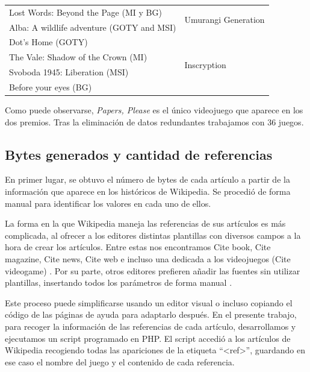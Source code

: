 \documentclass[spanish]{textolivre}
\begin{document}
\begin{table}[h!]
\begin{threeparttable}
\begin{tabular}{ll}
Lost Words: Beyond the Page (MI y BG) & \multirow{2}{*}{Umurangi Generation}\\ 
Alba: A wildlife adventure (GOTY and MSI) & \\
\midrule

Dot’s Home (GOTY) & \multirow{4}{*}{Inscryption}\\
The Vale: Shadow of the Crown (MI) & \\
Svoboda 1945: Liberation (MSI) & \\ 
Before your eyes (BG) & \\
\bottomrule
\end{tabular}
\end{threeparttable}
\end{table}

Como puede observarse, \emph{Papers, Please} es el único videojuego que aparece en los dos premios. Tras la eliminación de datos redundantes trabajamos con 36 juegos.


\subsection{Bytes generados y cantidad de referencias}
En primer lugar, se obtuvo el número de bytes de cada artículo a partir de la información que aparece en los históricos de Wikipedia. Se procedió de forma manual para identificar los valores en cada uno de ellos.

La forma en la que Wikipedia maneja las referencias de sus artículos es más complicada, al ofrecer a los editores distintas plantillas con diversos campos a la hora de crear los artículos. Entre estas nos encontramos Cite book, Cite magazine, Cite news, Cite web e incluso una dedicada a los videojuegos (Cite videogame) \cite{wikiciting7}. Por su parte, otros editores prefieren añadir las fuentes sin utilizar plantillas, insertando todos los parámetros de forma manual \cite{wikicitinginline}.

Este proceso puede simplificarse usando un editor visual o incluso copiando el código de las páginas de ayuda para adaptarlo después. En el presente trabajo, para recoger la información de las referencias de cada artículo, desarrollamos y ejecutamos un script programado en PHP. El script accedió a los artículos de Wikipedia recogiendo todas las apariciones de la etiqueta “<ref>”, guardando en ese caso el nombre del juego y el contenido de cada referencia.
\end{document}
